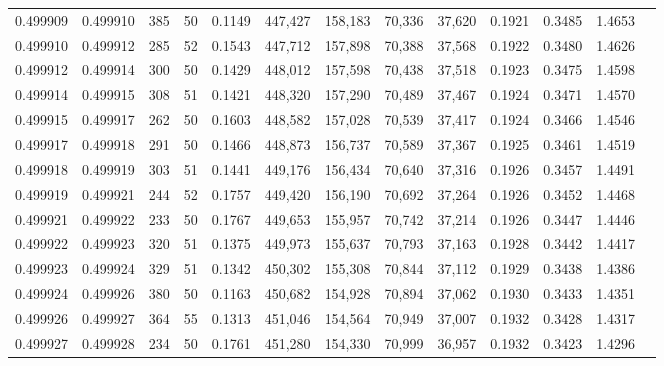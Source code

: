 \begin{tabular}{rrrrrrrrrrrrr}
0.499909 & 0.499910 & 385 &  50 &                                     0.1149 & 447,427 & 158,183 &  70,336 &  37,620 & 0.1921 & 0.3485 & 1.4653 \\
0.499910 & 0.499912 & 285 &  52 &                                     0.1543 & 447,712 & 157,898 &  70,388 &  37,568 & 0.1922 & 0.3480 & 1.4626 \\
0.499912 & 0.499914 & 300 &  50 &                                     0.1429 & 448,012 & 157,598 &  70,438 &  37,518 & 0.1923 & 0.3475 & 1.4598 \\
0.499914 & 0.499915 & 308 &  51 &                                     0.1421 & 448,320 & 157,290 &  70,489 &  37,467 & 0.1924 & 0.3471 & 1.4570 \\
0.499915 & 0.499917 & 262 &  50 &                                     0.1603 & 448,582 & 157,028 &  70,539 &  37,417 & 0.1924 & 0.3466 & 1.4546 \\
0.499917 & 0.499918 & 291 &  50 &                                     0.1466 & 448,873 & 156,737 &  70,589 &  37,367 & 0.1925 & 0.3461 & 1.4519 \\
0.499918 & 0.499919 & 303 &  51 &                                     0.1441 & 449,176 & 156,434 &  70,640 &  37,316 & 0.1926 & 0.3457 & 1.4491 \\
0.499919 & 0.499921 & 244 &  52 &                                     0.1757 & 449,420 & 156,190 &  70,692 &  37,264 & 0.1926 & 0.3452 & 1.4468 \\
0.499921 & 0.499922 & 233 &  50 &                                     0.1767 & 449,653 & 155,957 &  70,742 &  37,214 & 0.1926 & 0.3447 & 1.4446 \\
0.499922 & 0.499923 & 320 &  51 &                                     0.1375 & 449,973 & 155,637 &  70,793 &  37,163 & 0.1928 & 0.3442 & 1.4417 \\
0.499923 & 0.499924 & 329 &  51 &                                     0.1342 & 450,302 & 155,308 &  70,844 &  37,112 & 0.1929 & 0.3438 & 1.4386 \\
0.499924 & 0.499926 & 380 &  50 &                                     0.1163 & 450,682 & 154,928 &  70,894 &  37,062 & 0.1930 & 0.3433 & 1.4351 \\
0.499926 & 0.499927 & 364 &  55 &                                     0.1313 & 451,046 & 154,564 &  70,949 &  37,007 & 0.1932 & 0.3428 & 1.4317 \\
0.499927 & 0.499928 & 234 &  50 &                                     0.1761 & 451,280 & 154,330 &  70,999 &  36,957 & 0.1932 & 0.3423 & 1.4296 \\

\end{tabular}
